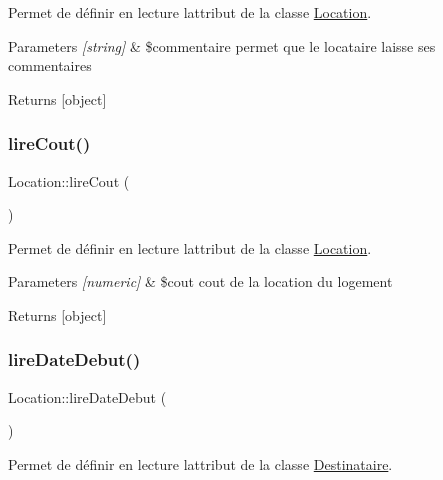 Permet de définir en lecture l\textquotesingle{}attribut de la classe \hyperlink{class_location}{Location}. 


\begin{DoxyParams}{Parameters}
{\em \mbox{[}string\mbox{]}} & \$commentaire permet que le locataire laisse ses commentaires \\
\hline
\end{DoxyParams}
\begin{DoxyReturn}{Returns}
\mbox{[}object\mbox{]} 
\end{DoxyReturn}
\mbox{\label{class_location_afe7ddd85e80decd9946555ca10116b8e}} 
\subsubsection{\texorpdfstring{lire\+Cout()}{lireCout()}}
{\footnotesize\ttfamily Location\+::lire\+Cout (\begin{DoxyParamCaption}{ }\end{DoxyParamCaption})}



Permet de définir en lecture l\textquotesingle{}attribut de la classe \hyperlink{class_location}{Location}. 


\begin{DoxyParams}{Parameters}
{\em \mbox{[}numeric\mbox{]}} & \$cout cout de la location du logement \\
\hline
\end{DoxyParams}
\begin{DoxyReturn}{Returns}
\mbox{[}object\mbox{]} 
\end{DoxyReturn}
\mbox{\label{class_location_a1ff21d7c6496b9a01767a2a2fc9847e4}} 
\subsubsection{\texorpdfstring{lire\+Date\+Debut()}{lireDateDebut()}}
{\footnotesize\ttfamily Location\+::lire\+Date\+Debut (\begin{DoxyParamCaption}{ }\end{DoxyParamCaption})}



Permet de définir en lecture l\textquotesingle{}attribut de la classe \hyperlink{class_destinataire}{Destinataire}. 


